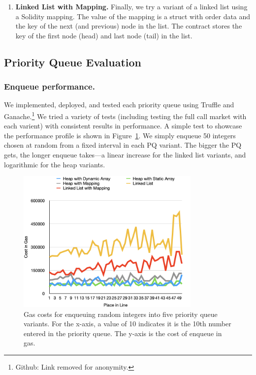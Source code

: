 \begin{enumerate}
\item \textbf{Linked List with Mapping.} Finally, we try a variant of a linked list using a Solidity mapping. The value of the mapping is a struct with order data and the key of the next (and previous) node in the list. The contract stores the key of the first node (head) and last node (tail) in the list. 

\end{enumerate}


\subsection{Priority Queue Evaluation} 

\subsubsection{Enqueue performance.} We implemented, deployed, and tested each priority queue using Truffle and Ganache.\footnote{Github: Link removed for anonymity.} We tried a variety of tests (including testing the full call market with each varient) with consistent results in performance. A simple test to showcase the performance profile is shown in Figure~\ref{fig:random_insertion}. We simply enqueue 50 integers chosen at random from a fixed interval in each PQ variant. The bigger the PQ gets, the longer enqueue takes---a linear increase for the linked list variants, and logarithmic for the heap variants. 



\begin{figure}[t]
\centering
\includegraphics[width=0.8\textwidth]{fig/random_insertion2.png}
\caption{\footnotesize{Gas costs for enqueuing random integers into five priority queue variants. For the x-axis, a value of 10 indicates it is the 10th number entered in the priority queue. The y-axis is the cost of enqueue in gas.}  \label{fig:random_insertion}}
\end{figure}




